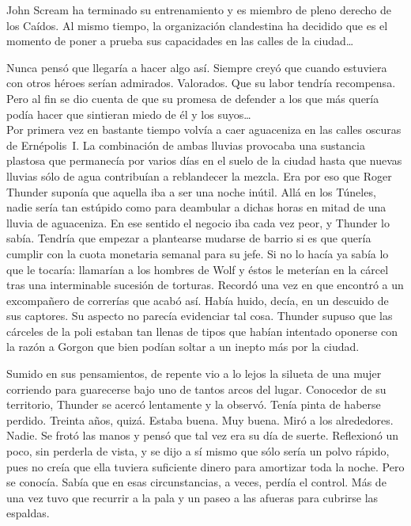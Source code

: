 \begin{prev}
    John Scream ha terminado su entrenamiento y es miembro de pleno derecho de los Caídos. Al mismo tiempo, la organización clandestina ha decidido que es el momento de poner a prueba sus capacidades en las calles de la ciudad\dots
\end{prev}

\noindent{}Nunca pensó que llegaría a hacer algo así. Siempre creyó que cuando estuviera con otros héroes serían admirados. Valorados. Que su labor tendría recompensa. Pero al fin se dio cuenta de que su promesa de defender a los que más quería podía hacer que sintieran miedo de él y los suyos\dots\\

\noindent{}Por primera vez en bastante tiempo volvía a caer aguaceniza en las calles oscuras de Ernépolis~I. La combinación de ambas lluvias provocaba una sustancia plastosa que permanecía por varios días en el suelo de la ciudad hasta que nuevas lluvias sólo de agua contribuían a reblandecer la mezcla. Era por eso que Roger Thunder suponía que aquella iba a ser una noche inútil. Allá en los Túneles, nadie sería tan estúpido como para deambular a dichas horas en mitad de una lluvia de aguaceniza. En ese sentido el negocio iba cada vez peor, y Thunder lo sabía. Tendría que empezar a plantearse mudarse de barrio si es que quería cumplir con la cuota monetaria semanal para su jefe. Si no lo hacía ya sabía lo que le tocaría: llamarían a los hombres de Wolf y éstos le meterían en la cárcel tras una interminable sucesión de torturas. Recordó una vez en que encontró a un excompañero de correrías que acabó así. Había huido, decía, en un descuido de sus captores. Su aspecto no parecía evidenciar tal cosa. Thunder supuso que las cárceles de la poli estaban tan llenas de tipos que habían intentado oponerse con la razón a Gorgon que bien podían soltar a un inepto más por la ciudad.

Sumido en sus pensamientos, de repente vio a lo lejos la silueta de una mujer corriendo para guarecerse bajo uno de tantos arcos del lugar. Conocedor de su territorio, Thunder se acercó lentamente y la observó. Tenía pinta de haberse perdido. Treinta años, quizá. Estaba buena. Muy buena. Miró a los alrededores. Nadie. Se frotó las manos y pensó que tal vez era su día de suerte. Reflexionó un poco, sin perderla de vista, y se dijo a sí mismo que sólo sería un polvo rápido, pues no creía que ella tuviera suficiente dinero para amortizar toda la noche. Pero se conocía. Sabía que en esas circunstancias, a veces, perdía el control. Más de una vez tuvo que recurrir a la pala y un paseo a las afueras para cubrirse las espaldas.

